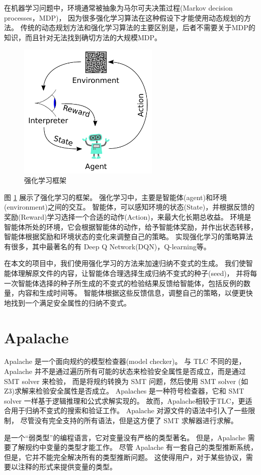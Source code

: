 在机器学习问题中，环境通常被抽象为马尔可夫决策过程(Markov decision processes，MDP)\cite{markov}，
因为很多强化学习算法在这种假设下才能使用动态规划的方法。
传统的动态规划方法和强化学习算法的主要区别是，后者不需要关于MDP的知识，而且针对无法找到确切方法的大规模MDP。

\begin{figure}
    \centering
    \includegraphics[width=0.6\textwidth]{figures/Reinforcement_learning_diagram.pdf}
    \caption{强化学习框架}
    \label{fig:rl}
\end{figure}
图 \ref{fig:rl} 展示了强化学习的框架。
强化学习中，主要是智能体(agent)和环境(environment)之间的交互。
智能体，可以感知环境的状态(State)，并根据反馈的奖励(Reward)学习选择一个合适的动作(Action)，来最大化长期总收益。
环境是智能体所处的环境，它会根据智能体的动作，给予智能体奖励，并作出状态转移，智能体根据奖励和环境状态的变化来调整自己的策略。
实现强化学习的策略算法有很多，其中最著名的有 Deep Q Network(DQN)\cite{dqn}，Q-learning\cite{q-learning}等。

在本文的项目中，我们使用强化学习的方法来加速归纳不变式的生成。
我们使智能体理解\TLA 原文件的内容，让智能体合理选择生成归纳不变式的种子(seed)，
并将每一次智能体选择的种子所生成的不变式的检验结果反馈给智能体，包括反例的数量，内容和生成时间等。
智能体根据这些反馈信息，调整自己的策略，以便更快地找到一个满足安全属性的归纳不变式。

\section{Apalache}
Apalache\cite{apalache1, apalache2} 是一个面向\TLA 规约的模型检查器(model checker)。
与 TLC 不同的是，Apalache 并不是通过遍历所有可能的状态来检验安全属性是否成立，而是通过 SMT solver 来检验，
而是将\TLA 规约转换为 SMT 问题，然后使用 SMT solver (如Z3\cite{z3})求解来检验安全属性是否成立。
Apalaches 是一种符号检查器，它和 SMT solver 一样基于逻辑推理和公式求解实现的。
故而，Apalache相较于TLC，更适合用于归纳不变式的搜索和验证工作。
Apalache 对\TLA 源文件的语法中引入了一些限制，
尽管没有完全支持\TLA 的所有语法，但是这方便了 SMT 求解器进行求解。

\TLA 是一个“弱类型”的编程语言，它对变量没有严格的类型著名。
但是，Apalache 需要了解\TLA 规约中变量的类型才能工作。
尽管 Apalache 有一套自己的类型推断系统，但是，它并不能完全解决所有的类型推断问题。
这使得用户，对于某些协议，需要以注释的形式来提供变量的类型。

